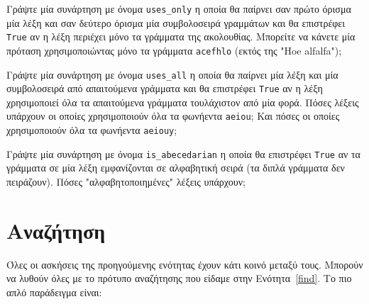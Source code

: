 \documentclass[10pt]{book}
\begin{document}
\begin{exercise}

Γράψτε μία συνάρτηση με όνομα \verb"uses_only" η οποία θα παίρνει σαν πρώτο όρισμα μία λέξη και σαν δεύτερο όρισμα μία συμβολοσειρά γραμμάτων και θα επιστρέφει {\tt True} αν η λέξη περιέχει μόνο τα γράμματα της ακολουθίας. Μπορείτε να κάνετε μία πρόταση χρησιμοποιώντας μόνο τα γράμματα {\tt acefhlo} (εκτός της  "Hoe alfalfa");
\\
\end{exercise}


\begin{exercise}

Γράψτε μία συνάρτηση με όνομα \verb"uses_all" η οποία θα παίρνει μία λέξη και μία συμβολοσειρά από απαιτούμενα γράμματα και θα επιστρέφει {\tt True} αν η λέξη χρησιμοποιεί όλα τα απαιτούμενα γράμματα τουλάχιστον από μία φορά. Πόσες λέξεις υπάρχουν οι οποίες χρησιμοποιούν όλα τα φωνήεντα {\tt aeiou}; 
Και πόσες οι οποίες χρησιμοποιούν όλα τα φωνήεντα {\tt aeiouy};
\\
\end{exercise}


\begin{exercise}

Γράψτε μία συνάρτηση με όνομα \verb"is_abecedarian" η οποία θα επιστρέφει {\tt True} αν τα γράμματα σε μία λέξη εμφανίζονται σε αλφαβητική σειρά (τα διπλά γράμματα δεν πειράζουν). Πόσες "αλφαβητοποιημένες" λέξεις υπάρχουν;
\end{exercise}







\section{Αναζήτηση}

Όλες οι ασκήσεις της προηγούμενης ενότητας έχουν κάτι κοινό μεταξύ τους. Μπορούν να λυθούν όλες με το πρότυπο αναζήτησης που είδαμε στην Ενότητα~\ref{find}. Το πιο απλό παράδειγμα είναι:
\end{document}
